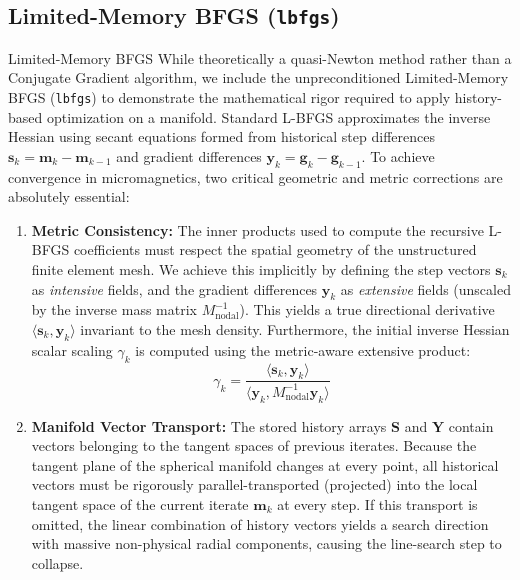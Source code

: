 \documentclass[11pt,a4paper]{article}
\begin{document}
\subsection{Limited-Memory BFGS (\texttt{lbfgs})}
Limited-Memory BFGS \cite{Nocedal1980}
While theoretically a quasi-Newton method rather than a Conjugate Gradient algorithm, we include the unpreconditioned Limited-Memory BFGS (\texttt{lbfgs}) to demonstrate the mathematical rigor required to apply history-based optimization on a manifold. Standard L-BFGS approximates the inverse Hessian using secant equations formed from historical step differences $\mathbf{s}_k = \mathbf{m}_k - \mathbf{m}_{k-1}$ and gradient differences $\mathbf{y}_k = \mathbf{g}_k - \mathbf{g}_{k-1}$. To achieve convergence in micromagnetics, two critical geometric and metric corrections are absolutely essential:
\begin{enumerate}
    \item \textbf{Metric Consistency:} The inner products used to compute the recursive L-BFGS coefficients must respect the spatial geometry of the unstructured finite element mesh. We achieve this implicitly by defining the step vectors $\mathbf{s}_k$ as \textit{intensive} fields, and the gradient differences $\mathbf{y}_k$ as \textit{extensive} fields (unscaled by the inverse mass matrix $M_{\text{nodal}}^{-1}$). This yields a true directional derivative $\langle \mathbf{s}_k, \mathbf{y}_k \rangle$ invariant to the mesh density. Furthermore, the initial inverse Hessian scalar scaling $\gamma_k$ is computed using the metric-aware extensive product:
    \begin{equation}
        \gamma_k = \frac{\langle \mathbf{s}_k, \mathbf{y}_k \rangle}{\langle \mathbf{y}_k, M_{\text{nodal}}^{-1} \mathbf{y}_k \rangle}
    \end{equation}
    \item \textbf{Manifold Vector Transport:} The stored history arrays $\mathbf{S}$ and $\mathbf{Y}$ contain vectors belonging to the tangent spaces of previous iterates. Because the tangent plane of the spherical manifold changes at every point, all historical vectors must be rigorously parallel-transported (projected) into the local tangent space of the current iterate $\mathbf{m}_k$ at every step. If this transport is omitted, the linear combination of history vectors yields a search direction with massive non-physical radial components, causing the line-search step to collapse.
\end{enumerate}
\end{document}
